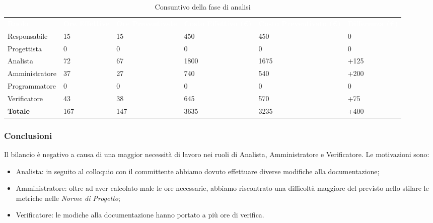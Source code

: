 \begin{table}[H]
\begin{center}
\renewcommand{\arraystretch}{1.5}
\begin{tabular}{ m{}<{\centering}  m{}<{\centering} m{}<{\centering} m{}<{\centering} m{}<{\centering} m{}<{\centering}}
	\rowcolor{darkblue}
	\textcolor{white}{\textbf{Ruolo}} & \textcolor{white}{\textbf{Ore Effettive}} & \textcolor{white}{\textbf{Ore Preventivate}}&\textcolor{white}{\textbf{Costo Effettivo (\euro) }}&\textcolor{white}{\textbf{Costo Preventivato (\euro)}}&\textcolor{white}{\textbf{Differenza (\euro)}}\\ 

	Responsabile  & 15 & 15 & 450 & 450 & 0\\	
	
	Progettista & 0 & 0 & 0 & 0 & 0\\
	
	Analista & 72 & 67 & 1800 & 1675 & +125\\
	
	Amministratore & 37 & 27 & 740 & 540 & +200\\
	
	Programmatore & 0 & 0 &0 &0 & 0\\
	
	Verificatore & 43 & 38 & 645 & 570 & +75\\
	
	\textbf{Totale} & 167 & 147 & 3635 & 3235 & +400\\
	
\end{tabular}
\caption{Consuntivo della fase di analisi}
\end{center}
\end{table}

\subsubsection{Conclusioni}
Il bilancio è negativo a causa di una maggior necessità di lavoro nei ruoli di Analista, Amministratore e Verificatore. Le motivazioni sono:
\begin{itemize}
\item Analista: in seguito al colloquio con il committente abbiamo dovuto effettuare diverse modifiche alla documentazione;
\item Amministratore: oltre ad aver calcolato male le ore necessarie, abbiamo riscontrato una difficoltà maggiore del previsto nello stilare le metriche nelle \textit{Norme di Progetto};
\item Verificatore: le modiche alla documentazione hanno portato a più ore di verifica.
\end{itemize}

